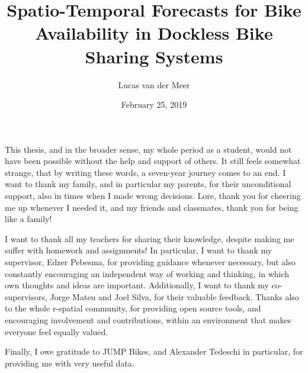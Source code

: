 \documentclass[12pt,oneside]{reedthesis}
\title{Spatio-Temporal Forecasts for Bike Availability in Dockless Bike Sharing
Systems}
\author{Lucas van der Meer}
\date{February 25, 2019}
\begin{document}
  \maketitle

\frontmatter %
\pagestyle{empty} %
  \begin{acknowledgements}
    This thesis, and in the broader sense, my whole period as a student,
    would not have been possible without the help and support of others. It
    still feels somewhat strange, that by writing these words, a seven-year
    journey comes to an end. I want to thank my family, and in particular my
    parents, for their unconditional support, also in times when I made
    wrong decisions. Lore, thank you for cheering me up whenever I needed
    it, and my friends and classmates, thank you for being like a family!
    \par
    
    I want to thank all my teachers for sharing their knowledge, despite
    making me suffer with homework and assignments! In particular, I want to
    thank my supervisor, Edzer Pebesma, for providing guidance whenever
    necessary, but also constantly encouraging an independent way of working
    and thinking, in which own thoughts and ideas are important.
    Additionally, I want to thank my co-supervisors, Jorge Mateu and Joel
    Silva, for their valuable feedback. Thanks also to the whole r-spatial
    community, for providing open source tools, and encouraging involvement
    and contributions, within an environment that makes everyone feel
    equally valued. \par
    Finally, I owe gratitude to JUMP Bikes, and Alexander Tedeschi in
    particular, for providing me with very useful data.
  \end{acknowledgements}

  \hypersetup{linkcolor=black}
  \setcounter{tocdepth}{4}
  \tableofcontents

  \listoftables
\end{document}

